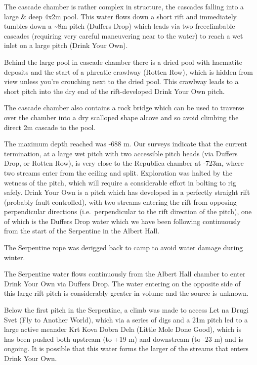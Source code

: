 The cascade chamber is rather complex in structure, the cascades falling
into a large \& deep 4x2m pool. This water flows down a short rift and
immediately tumbles down a \textasciitilde{}8m pitch (Duffers Drop)
which leads via two freeclimbable cascades (requiring very careful
maneuvering near to the water) to reach a wet inlet on a large pitch
(Drink Your Own).

Behind the large pool in cascade chamber there is a dried pool with
haematite deposits and the start of a phreatic crawlway (Rotten Row),
which is hidden from view unless you're crouching next to the dried
pool. This crawlway leads to a short pitch into the dry end of the
rift-developed Drink Your Own pitch.

The cascade chamber also contains a rock bridge which can be used to
traverse over the chamber into a dry scalloped shape alcove and so avoid
climbing the direct 2m cascade to the pool.

The maximum depth reached was -688 m. Our surveys indicate that the
current termination, at a large wet pitch with two accessible pitch
heads (via Duffers Drop, or Rotten Row), is very close to the Republica
chamber at -723m, where two streams enter from the ceiling and split.
Exploration was halted by the wetness of the pitch, which will require a
considerable effort in bolting to rig safely. Drink Your Own is a pitch
which has developed in a perfectly straight rift (probably fault
controlled), with two streams entering the rift from opposing
perpendicular directions (i.e.~perpendicular to the rift direction of
the pitch), one of which is the Duffers Drop water which we have been
following continuously from the start of the Serpentine in the Albert
Hall.

The Serpentine rope was derigged back to camp to avoid water damage
during winter.

The Serpentine water flows continuously from the Albert Hall chamber to
enter Drink Your Own via Duffers Drop. The water entering on the
opposite side of this large rift pitch is considerably greater in volume
and the source is unknown.

Below the first pitch in the Serpentine, a climb was made to access Let
na Drugi Svet (Fly to Another World), which via a series of digs and a
21m pitch led to a large active meander Krt Kova Dobra Dela (Little Mole
Done Good), which is has been pushed both upstream (to +19 m) and
downstream (to -23 m) and is ongoing. It is possible that this water
forms the larger of the streams that enters Drink Your Own.


